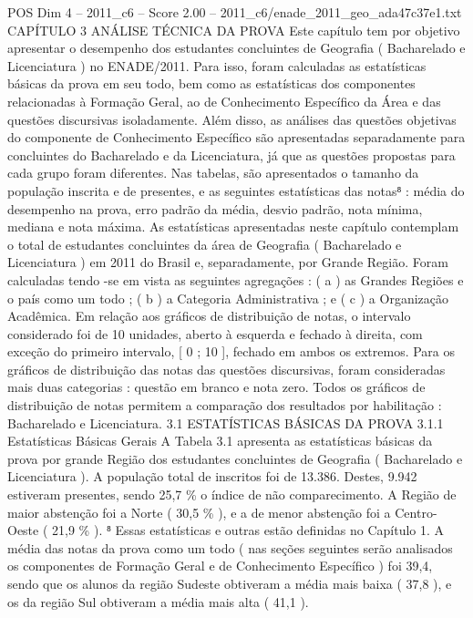 \begin{textsample}{POS Dim 4 – 2011\_c6 – Score 2.00 – 2011\_c6/enade\_2011\_geo\_ada47c37e1.txt}  \label{ex:f4_pos_300}
CAPÍTULO 3 ANÁLISE TÉCNICA DA PROVA Este capítulo tem por objetivo apresentar o desempenho dos estudantes concluintes de Geografia ( Bacharelado e Licenciatura ) no ENADE/2011.
Para isso, foram calculadas as estatísticas básicas da prova em seu todo, bem como as estatísticas dos componentes relacionadas à Formação Geral, ao de Conhecimento Específico da Área e das questões discursivas isoladamente.
Além disso, as análises das questões objetivas do componente de Conhecimento Específico são apresentadas separadamente para concluintes do Bacharelado e da Licenciatura, já que as questões propostas para cada grupo foram diferentes.
Nas tabelas, são apresentados o tamanho da população inscrita e de presentes, e as seguintes estatísticas das notas⁸ : média do desempenho na prova, erro padrão da média, desvio padrão, nota mínima, mediana e nota máxima.
As estatísticas apresentadas neste capítulo contemplam o total de estudantes concluintes da área de Geografia ( Bacharelado e Licenciatura ) em 2011 do Brasil e, separadamente, por Grande Região.
Foram calculadas tendo -se em vista as seguintes agregações : ( a ) as Grandes Regiões e o país como um todo ; ( b ) a Categoria Administrativa ; e ( c ) a Organização Acadêmica.
Em relação aos gráficos de distribuição de notas, o intervalo considerado foi de 10 unidades, aberto à esquerda e fechado à direita, com exceção do primeiro intervalo, [ 0 ; 10 ], fechado em ambos os extremos.
Para os gráficos de distribuição das notas das questões discursivas, foram consideradas mais duas categorias : questão em branco e nota zero.
Todos os gráficos de distribuição de notas permitem a comparação dos resultados por habilitação : Bacharelado e Licenciatura. 3.1 ESTATÍSTICAS BÁSICAS DA PROVA 3.1.1 Estatísticas Básicas Gerais A Tabela 3.1 apresenta as estatísticas básicas da prova por grande Região dos estudantes concluintes de Geografia ( Bacharelado e Licenciatura ).
A população total de inscritos foi de 13.386.
Destes, 9.942 estiveram presentes, sendo 25,7 \% o índice de não comparecimento.
A Região de maior abstenção foi a Norte ( 30,5 \% ), e a de menor abstenção foi a Centro-Oeste ( 21,9 \% ). ⁸ Essas estatísticas e outras estão definidas no Capítulo 1.
A média das notas da prova como um todo ( nas seções seguintes serão analisados os componentes de Formação Geral e de Conhecimento Específico ) foi 39,4, sendo que os alunos da região Sudeste obtiveram a média mais baixa ( 37,8 ), e os da região Sul obtiveram a média mais alta ( 41,1 ).

\end{textsample}
